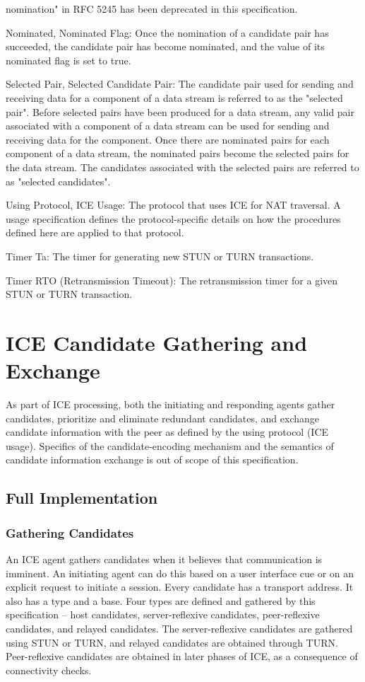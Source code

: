 \documentclass{article}
\begin{document}
nomination" in RFC 5245 has been deprecated in this specification.

Nominated, Nominated Flag:  Once the nomination of a candidate pair has succeeded, the candidate pair has become nominated, and the value of its nominated flag is set to true.

Selected Pair, Selected Candidate Pair:  The candidate pair used for sending and receiving data for a component of a data stream is referred to as the "selected pair".  Before selected pairs have been produced for a data stream, any valid pair associated with a component of a data stream can be used for sending and receiving data for the component.  Once there are nominated pairs for each component of a data stream, the nominated pairs become the selected pairs for the data stream.  The candidates associated with the selected pairs are referred to as "selected candidates".

Using Protocol, ICE Usage:  The protocol that uses ICE for NAT traversal.  A usage specification defines the protocol-specific details on how the procedures defined here are applied to that protocol.

Timer Ta:  The timer for generating new STUN or TURN transactions.

Timer RTO (Retransmission Timeout):  The retransmission timer for a given STUN or TURN transaction.

\section{ICE Candidate Gathering and Exchange}

As part of ICE processing, both the initiating and responding agents gather candidates, prioritize and eliminate redundant candidates, and exchange candidate information with the peer as defined by the using protocol (ICE usage).  Specifics of the candidate-encoding mechanism and the semantics of candidate information exchange is out of scope of this specification.

\subsection{Full Implementation}

\subsubsection{Gathering Candidates}

An ICE agent gathers candidates when it believes that communication is imminent.  An initiating agent can do this based on a user interface cue or on an explicit request to initiate a session.  Every candidate has a transport address.  It also has a type and a base. Four types are defined and gathered by this specification -- host candidates, server-reflexive candidates, peer-reflexive candidates, and relayed candidates.  The server-reflexive candidates are gathered using STUN or TURN, and relayed candidates are obtained through TURN. Peer-reflexive candidates are obtained in later phases of ICE, as a consequence of connectivity checks.
\end{document}
